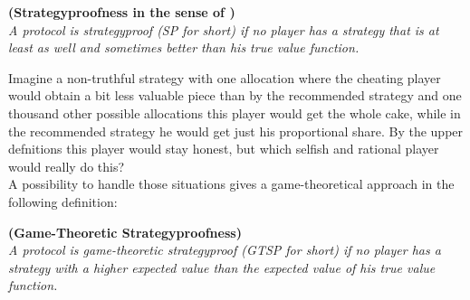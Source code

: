 \begin{defi}{\textbf{(Strategyproofness in the sense of \cite{note})}}\\
\emph{A protocol is \emph{strategyproof} (SP for short) if no player has a strategy that is at least as well and sometimes better than his true value function.}
\end{defi}
Imagine a non-truthful strategy with one allocation where the cheating player would obtain a bit less valuable piece than by the recommended strategy and one thousand other possible allocations this player would get the whole cake, while in the recommended strategy he would get just his proportional share. By the upper defnitions this player would stay honest, but which selfish and rational player would really do this?\\
A possibility to handle those situations gives a game-theoretical approach in the following definition:
\begin{defi}{\textbf{(Game-Theoretic Strategyproofness)}}\\
\emph{A protocol is \emph{game-theoretic strategyproof} (GTSP for short) if no player has a strategy with a higher expected value than the expected value of his true value function.}
\end{defi}
